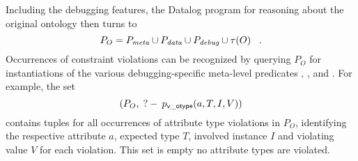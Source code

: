 Including the debugging features, the Datalog program for
reasoning about the original ontology then turns to \compress
\begin{displaymath}
    P_O = \mlaxioms \cup \dataaxioms \cup \debugaxioms \cup \tau(O)
    \;\;\;. \compress
\end{displaymath}
Occurrences of constraint violations can be recognized by querying
$P_O$ for instantiations of the various debugging-specific
meta-level predicates \pvotype, \pvmincard, \pvmaxcard and
\pvuser. For example, the set \compress
\begin{displaymath}
    (P_O , \qury \pvotype(a,T,I,V)) \compress
\end{displaymath}
contains tuples for all occurrences of attribute type violations
in $P_O$, identifying the respective attribute $a$, expected type
$T$, involved instance $I$ and violating value $V$ for each
violation. This set is empty no attribute types are violated.
